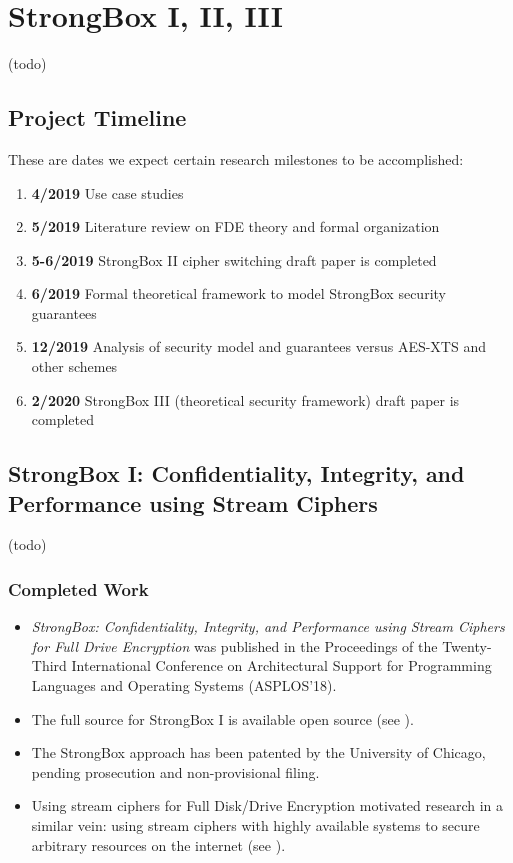 \chapter{StrongBox I, II, III} \label{chp:strongbox}

(todo)

\section{Project Timeline}

These are dates we expect certain research milestones to be accomplished:

\begin{enumerate}
    \item \textbf{4/2019} Use case studies
    \item \textbf{5/2019} Literature review on FDE theory and formal organization
    \item \textbf{5-6/2019} StrongBox II cipher switching draft paper is completed
    \item \textbf{6/2019} Formal theoretical framework to model StrongBox
    security guarantees
    \item \textbf{12/2019} Analysis of security model and guarantees versus
    AES-XTS and other schemes
    \item \textbf{2/2020} StrongBox III (theoretical security framework) draft
    paper is completed
\end{enumerate}

\section{StrongBox I: Confidentiality, Integrity, and Performance using Stream Ciphers}

(todo)

\subsection{Completed Work}

\begin{itemize}
    \item \textit{StrongBox: Confidentiality, Integrity, and Performance using
    Stream Ciphers for Full Drive Encryption} was published in the Proceedings
    of the Twenty-Third International Conference on Architectural Support for
    Programming Languages and Operating Systems (ASPLOS'18).

    \item The full source for StrongBox I is available open source (see
    ).

    \item The StrongBox approach has been patented by the University of Chicago,
    pending prosecution and non-provisional filing.

    \item Using stream ciphers for Full Disk/Drive Encryption motivated research
    in a similar vein: using stream ciphers with highly available systems to
    secure arbitrary resources on the internet (see ).
\end{itemize}

